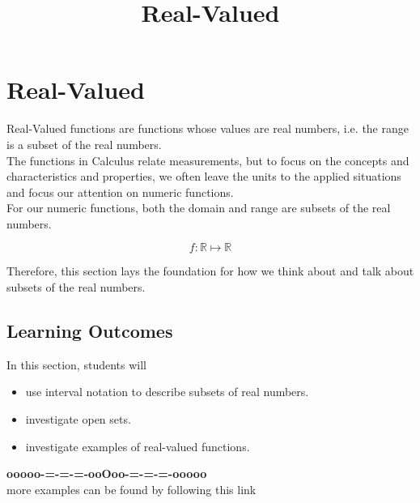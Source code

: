 \documentclass{ximera}
\title{Real-Valued}
\begin{document}
\begin{abstract}
\end{abstract}
\maketitle




\section*{Real-Valued}


Real-Valued functions are functions whose values are real numbers, i.e. the range is a subset of the real numbers. \\


The functions in Calculus relate measurements, but to focus on the concepts and characteristics and properties, we often leave the units to the applied situations and focus our attention on numeric functions. \\


For our numeric functions, both the domain and range are subsets of the real numbers. 

\[
f : \mathbb{R} \mapsto \mathbb{R}
\]


Therefore, this section lays the foundation for how we think about and talk about subsets of the real numbers.










\subsection*{Learning Outcomes}





\begin{sectionOutcomes}
In this section, students will 

\begin{itemize}
\item use interval notation to describe subsets of real numbers.
\item investigate open sets.
\item investigate examples of real-valued functions.
\end{itemize}
\end{sectionOutcomes}










\begin{center}
\textbf{\textcolor{green!50!black}{ooooo-=-=-=-ooOoo-=-=-=-ooooo}} \\

more examples can be found by following this link\\ 

\end{center}
\end{document}
